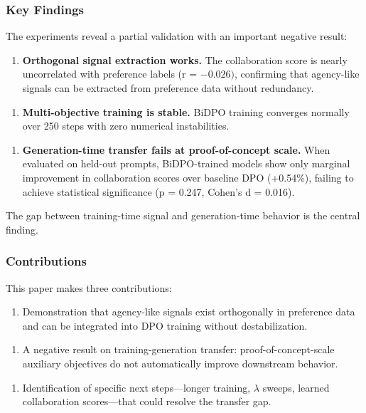 \subsubsection{Key Findings}

The experiments reveal a partial validation with an important negative result:

\begin{enumerate}
\item \textbf{Orthogonal signal extraction works.} The collaboration score is nearly uncorrelated with preference labels (r = $-0.026)$, confirming that agency-like signals can be extracted from preference data without redundancy.
\end{enumerate}

\begin{enumerate}
\item \textbf{Multi-objective training is stable.} BiDPO training converges normally over 250 steps with zero numerical instabilities.
\end{enumerate}

\begin{enumerate}
\item \textbf{Generation-time transfer fails at proof-of-concept scale.} When evaluated on held-out prompts, BiDPO-trained models show only marginal improvement in collaboration scores over baseline DPO (+0.54\%), failing to achieve statistical significance (p = 0.247, Cohen's d = 0.016).
\end{enumerate}

The gap between training-time signal and generation-time behavior is the central finding.

\subsubsection{Contributions}

This paper makes three contributions:

\begin{enumerate}
\item Demonstration that agency-like signals exist orthogonally in preference data and can be integrated into DPO training without destabilization.
\end{enumerate}

\begin{enumerate}
\item A negative result on training-generation transfer: proof-of-concept-scale auxiliary objectives do not automatically improve downstream behavior.
\end{enumerate}

\begin{enumerate}
\item Identification of specific next steps---longer training, $\lambda$ sweeps, learned collaboration scores---that could resolve the transfer gap.
\end{enumerate}

